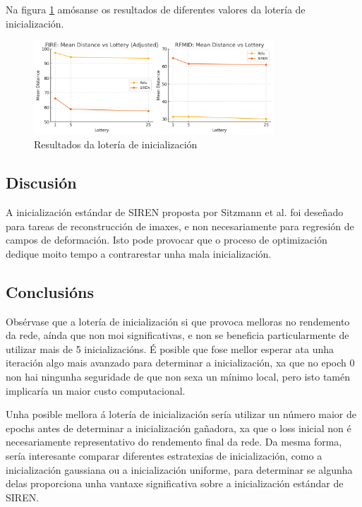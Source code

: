 Na figura \ref{fig:lottery} amósanse os resultados de diferentes valores da lotería de inicialización.


\begin{figure}[ht]
    \centering
    \includegraphics[width=0.8\textwidth]{imaxes/lottery/lotery.png}
    \caption{Resultados da lotería de inicialización}
    \label{fig:lottery}
\end{figure}


\subsection{Discusión}
\label{subsec:Discusion-initialization}

A inicialización estándar de SIREN proposta por Sitzmann et al. \cite{sitzmann2020implicitneuralrepresentationsperiodic} foi deseñado para tareas de reconstrucción de imaxes, e non necesariamente para regresión de campos de deformación.
Isto pode provocar que o proceso de optimización dedique moito tempo a contrarestar unha mala inicialización. 

\subsection{Conclusións}
\label{subsec:Conclusions-initialization}

Obsérvase que a lotería de inicialización si que provoca melloras no rendemento da rede, aínda que non moi significativas, e non se beneficia particularmente de utilizar mais de 5 inicializacións.
É posible que fose mellor esperar ata unha iteración algo mais avanzado para determinar a inicialización, xa que no epoch 0 non hai ningunha seguridade de que non sexa un mínimo local, pero isto tamén implicaría un maior custo computacional.

Unha posible mellora á lotería de inicialización sería utilizar un número maior de epochs antes de determinar a inicialización gañadora, xa que o loss inicial non é necesariamente representativo do rendemento final da rede.
Da mesma forma, sería interesante comparar diferentes estratexias de inicialización, como a inicialización gaussiana ou a inicialización uniforme, para determinar se algunha delas proporciona unha vantaxe significativa sobre a inicialización estándar de SIREN.

